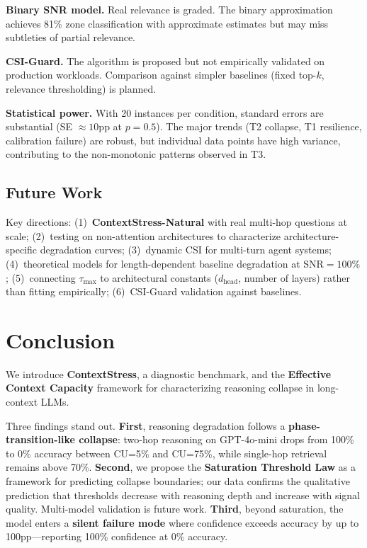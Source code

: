 \documentclass{article}
\begin{document}
\textbf{Binary SNR model.} Real relevance is graded. The binary approximation achieves 81\% zone classification with approximate estimates but may miss subtleties of partial relevance.

\textbf{CSI-Guard.} The algorithm is proposed but not empirically validated on production workloads. Comparison against simpler baselines (fixed top-$k$, relevance thresholding) is planned.

\textbf{Statistical power.} With 20 instances per condition, standard errors are substantial (SE $\approx 10$pp at $p{=}0.5$). The major trends (T2 collapse, T1 resilience, calibration failure) are robust, but individual data points have high variance, contributing to the non-monotonic patterns observed in T3.

\subsection{Future Work}

Key directions: (1)~\textbf{ContextStress-Natural} with real multi-hop questions at scale; (2)~testing on non-attention architectures to characterize architecture-specific degradation curves; (3)~dynamic CSI for multi-turn agent systems; (4)~theoretical models for length-dependent baseline degradation at SNR${=}100\%$; (5)~connecting $\tau_{\max}$ to architectural constants ($d_{\text{head}}$, number of layers) rather than fitting empirically; (6)~CSI-Guard validation against baselines.

\section{Conclusion}
\label{sec:conclusion}

We introduce \textbf{ContextStress}, a diagnostic benchmark, and the \textbf{Effective Context Capacity} framework for characterizing reasoning collapse in long-context LLMs.

Three findings stand out.
\textbf{First}, reasoning degradation follows a \textbf{phase-transition-like collapse}: two-hop reasoning on GPT-4o-mini drops from 100\% to 0\% accuracy between CU=5\% and CU=75\%, while single-hop retrieval remains above 70\%.
\textbf{Second}, we propose the \textbf{Saturation Threshold Law} as a framework for predicting collapse boundaries; our data confirms the qualitative prediction that thresholds decrease with reasoning depth and increase with signal quality. Multi-model validation is future work.
\textbf{Third}, beyond saturation, the model enters a \textbf{silent failure mode} where confidence exceeds accuracy by up to 100pp---reporting 100\% confidence at 0\% accuracy.
\end{document}
